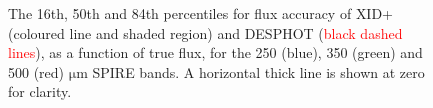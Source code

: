 \documentclass[useAMS,usenatbib]{mnras}
\begin{document}
\begin{figure}
\centering 
\caption{The 16th, 50th and 84th percentiles for flux accuracy of \textsc{XID+} (coloured line and shaded region) and \textsc{DESPHOT} (\textcolor{red}{black dashed lines}), as a function of true flux, for the 250 (blue), 350 (green) and 500 (red) $\mathrm{\mu m}$ SPIRE bands. A horizontal thick line is shown at zero for clarity.}\label{fig:accuracy}
\end{figure}
\end{document}
